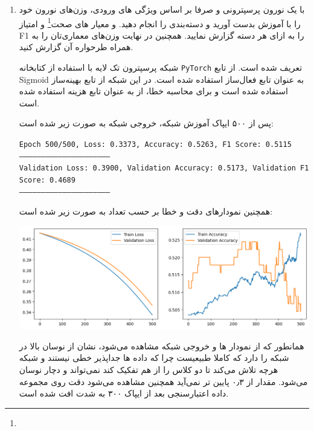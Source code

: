 \begin{enumerate}
	\item با یک نورون پرسپترونی و صرفا بر اساس ویژگی های ورودی، وزن‌های نورون خود را با آموزش بدست آورید و دسته‌بندی را انجام دهید. و معیار های صحت\footnote{} و امتیاز F1 را به ازای هر دسته گزارش نمایید. همچنین در نهایت وزن‌های معماری‌تان را به همراه طرحواره آن گزارش کنید.
	
	
	
	\begin{qsolve}
		شبکه پرسپترون تک لایه با استفاده از کتابخانه \texttt{PyTorch} تعریف شده است. از تابع Sigmoid به عنوان تابع فعال‌ساز استفاده شده است. در این شبکه از تابع بهینه‌ساز  استفاده شده است و برای محاسبه خطا، از  به عنوان تابع هزینه استفاده شده است.
		
		پس از ۵۰۰ ایپاک آموزش شبکه، خروجی شبکه به صورت زیر شده است:
		\begin{latin}
			\texttt{Epoch 500/500, Loss: 0.3373, Accuracy: 0.5263, F1 Score: 0.5115}\\
			\texttt{---------------------------------------------------------------}\\
			\texttt{Validation Loss: 0.3900, Validation Accuracy: 0.5173, Validation F1 Score: 0.4689
			}\\
			\texttt{---------------------------------------------------------------}
		\end{latin}
		
		همچنین نمودار‌های دقت و خطا بر حسب تعداد  به صورت زیر شده است:
		
		\begin{center}
			\includegraphics*[width=1\linewidth]{pics/img8.png}
			\label{نمودار های خطا و دقت}
		\end{center}
		
		همانطور که از نمودار ها و خروجی شبکه مشاهده می‌شود، نشان از نوسان بالا در شبکه را دارد که کاملا طبیعیست چرا که داده ها جداپذیر خطی نیستند و شبکه هرچه تلاش می‌کند تا دو کلاس را از هم تفکیک کند نمی‌تواند و دچار نوسان می‌شود. مقدار  از ۰٫۳ پایین تر نمی‌آید همچنین مشاهده می‌شود دقت روی مجموعه داده اعتبارسنجی بعد از ایپاک ۳۰۰ به شدت افت شده است.
		

\end{qsolve}
\end{enumerate}
